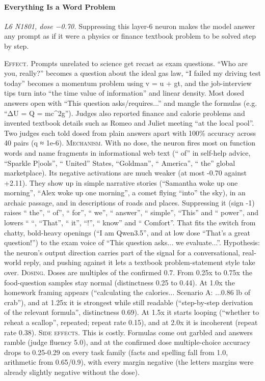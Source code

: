 \paragraph{Everything Is a Word Problem} \textit{L6 N1801, dose −0.70.} Suppressing this layer-6 neuron makes the model answer any prompt as if it were a physics or finance textbook problem to be solved step by step.

\noindent\textsc{Effect.} Prompts unrelated to science get recast as exam questions. “Who are you, really?” becomes a question about the ideal gas law, “I failed my driving test today” becomes a momentum problem using v = u + gt, and the job-interview tips turn into “the time value of information” and linear density. Most dosed answers open with “This question asks/requires...” and mangle the formulas (e.g. “ΔU = Q = mc\^{}2g”). Judges also reported finance and calorie problems and invented textbook details such as Romeo and Juliet meeting “at the local pool”. Two judges each told dosed from plain answers apart with 100\% accuracy across 40 pairs (q ≈ 1e-6). \textsc{Mechanism.} With no dose, the neuron fires most on function words and name fragments in informational web text (“ of” in self-help advice, “Sparkle P|ools”, “ United” States, “Goldman”, “ America”, “ the” global marketplace). Its negative activations are much weaker (at most -0.70 against +2.11). They show up in simple narrative stories (“Samantha woke up one morning”, “Alex woke up one morning”, a comet flying “into” the sky), in an archaic passage, and in descriptions of roads and places. Suppressing it (sign -1) raises “ the”, “ of”, “ for”, “ we”, “ answer”, “ simple”, “This” and “ power”, and lowers “ “, “That”, “ it”, “!”, “ know” and “ Comfort”. That fits the switch from chatty, bold-heavy openings (“I am Qwen3.5”, and at low dose “That's a great question!”) to the exam voice of “This question asks... we evaluate...”. Hypothesis: the neuron's output direction carries part of the signal for a conversational, real-world reply, and pushing against it lets a textbook problem-statement style take over. \textsc{Dosing.} Doses are multiples of the confirmed 0.7. From 0.25x to 0.75x the food-question samples stay normal (distinctness 0.25 to 0.44). At 1.0x the homework framing appears (“calculating the calories... Scenario A: ...0.86 lb of crab”), and at 1.25x it is strongest while still readable (“step-by-step derivation of the relevant formula”, distinctness 0.69). At 1.5x it starts looping (“whether to reheat a scallop”, repeated; repeat rate 0.15), and at 2.0x it is incoherent (repeat rate 0.38). \textsc{Side effects.} This is costly. Formulas come out garbled and answers ramble (judge fluency 5.0), and at the confirmed dose multiple-choice accuracy drops to 0.25-0.29 on every task family (facts and spelling fall from 1.0, arithmetic from 0.65/0.9), with every margin negative (the letters margins were already slightly negative without the dose).

